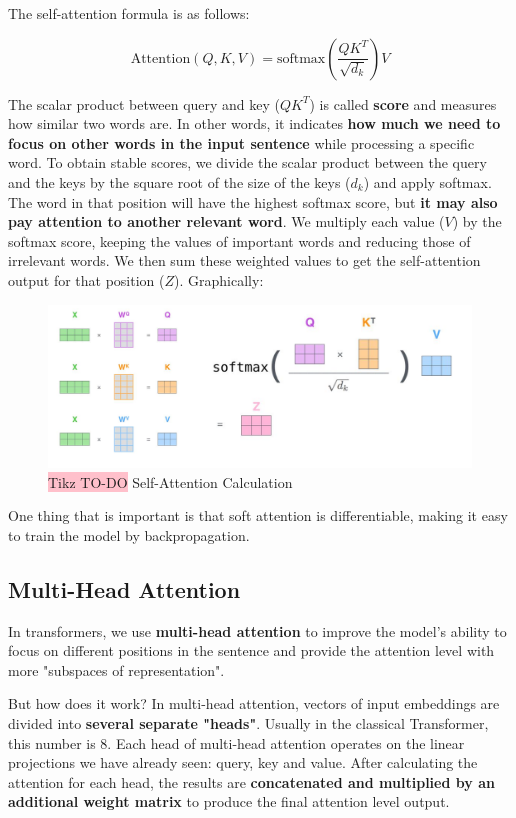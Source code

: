 The self-attention formula is as follows:

$$
    \text{Attention}(Q,K,V) = \text{softmax}\left(\frac{QK^T}{\sqrt{d_k}}\right)V
$$

The scalar product between query and key ($QK^T$) is called \textbf{score} and measures how similar two words are. In other words, it indicates \textbf{how much we need to focus on other words in the input sentence} while processing a specific word. To obtain stable scores, we divide the scalar product between the query and the keys by the square root of the size of the keys (\(d_k\)) and apply softmax. The word in that position will have the highest softmax score, but \textbf{it may also pay attention to another relevant word}. We multiply each value ($V$) by the softmax score, keeping the values of important words and reducing those of irrelevant words. We then sum these weighted values to get the self-attention output for that position ($Z$). Graphically:

\begin{figure}[!htbp]
    \centering
    \includegraphics[width=0.8\linewidth]{tikz/chapter8 - Self-Attention Calculation.png}
    \caption{{\color{red}\colorbox{pink}{Tikz TO-DO}} Self-Attention Calculation}
\end{figure}

One thing that is important is that soft attention is differentiable, making it easy to train the model by backpropagation.


\subsection{Multi-Head Attention}
In transformers, we use \textbf{multi-head attention} to improve the model's ability to focus on different positions in the sentence and provide the attention level with more "subspaces of representation".

But how does it work? In multi-head attention, vectors of input embeddings are divided into \textbf{several separate "heads"}. Usually in the classical Transformer, this number is 8. Each head of multi-head attention operates on the linear projections we have already seen: query, key and value. After calculating the attention for each head, the results are \textbf{concatenated and multiplied by an additional weight matrix} to produce the final attention level output.

